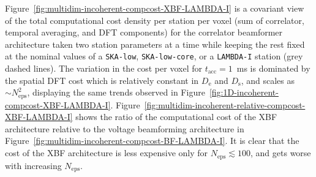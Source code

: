 \documentclass[
  journal=pasa,
  manuscript=article-type,
  year=2020,
  volume=37,
]{cup-journal}
\begin{document}
Figure~\ref{fig:multidim-incoherent-compcost-XBF-LAMBDA-I} is a covariant view of the total computational cost density per station per voxel (sum of correlator, temporal averaging, and DFT components) for the correlator beamformer architecture taken two station parameters at a time while keeping the rest fixed at the nominal values of a \texttt{SKA-low}, \texttt{SKA-low-core}, or a \texttt{LAMBDA-I} station (grey dashed lines). The variation in the cost per voxel for $t_\textrm{acc}=1$~ms is dominated by the spatial DFT cost which is relatively constant in $D_\textrm{e}$ and $D_\textrm{s}$, and scales as $\sim N_\textrm{eps}^2$, displaying the same trends observed in Figure~\ref{fig:1D-incoherent-compcost-XBF-LAMBDA-I}. Figure~\ref{fig:multidim-incoherent-relative-compcost-XBF-LAMBDA-I} shows the ratio of the computational cost of the XBF architecture relative to the voltage beamforming architecture in Figure~\ref{fig:multidim-incoherent-compcost-BF-LAMBDA-I}. It is clear that the cost of the XBF architecture is less expensive only for $N_\textrm{eps}\lesssim 100$, and gets worse with increasing $N_\textrm{eps}$.
\end{document}
